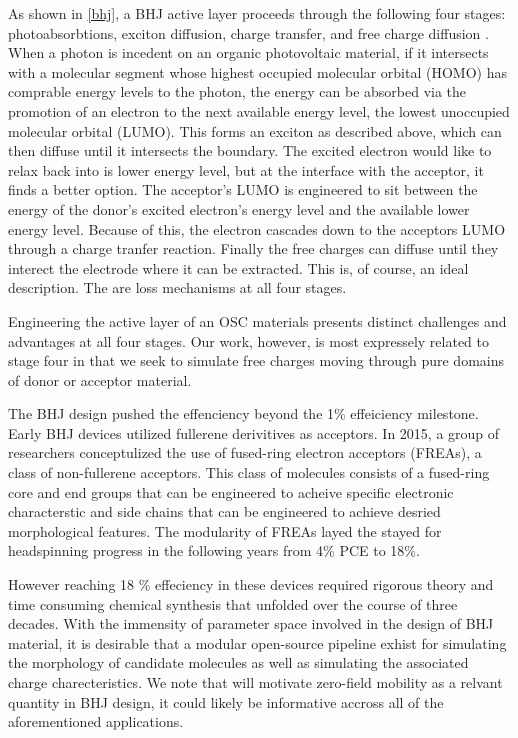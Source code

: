 As shown in \ref{bhj}, a BHJ active layer proceeds through the following four stages: photoabsorbtions, 
exciton diffusion, charge transfer, and free charge diffusion \citet{Fusella2019}. When a photon is incedent on
an organic photovoltaic material, if it intersects with a molecular segment whose 
highest occupied molecular orbital (HOMO) has comprable energy levels to the photon, the energy can be absorbed via the promotion of
an electron to the next available energy level, the lowest unoccupied molecular orbital (LUMO).
This forms an exciton as
described above, which can then diffuse until it intersects the boundary. 
The excited electron would like to relax
back into is lower energy level, but at the interface with the acceptor, it finds a better option. The
acceptor's LUMO is engineered to sit between the energy of the donor's excited electron's energy level and the
available lower energy level. Because of this, the electron cascades down to the acceptors LUMO through a charge
tranfer reaction. Finally the free charges can diffuse until they interect the electrode where it can be
extracted. This is, of course, an ideal description. The are loss mechanisms at all four stages. 

Engineering the active layer of an OSC materials presents distinct challenges and advantages at
all four stages. Our work, however,  is most expressely related to stage four in that we seek to simulate free charges moving
through pure domains of donor or acceptor material. 

The BHJ design pushed the effenciency beyond the 1\% effeiciency milestone. Early BHJ devices utilized
fullerene derivitives as acceptors. In 2015, a group of researchers conceptulized the use of
fused-ring electron acceptors (FREAs), a class of non-fullerene acceptors. This class of molecules consists of
a fused-ring core and end groups that can be engineered to acheive specific electronic characterstic and side
chains that can be engineered to achieve desried morphological features. The modularity of FREAs
layed the stayed for headspinning progress in the following years from 4\% PCE to 18\%.
\cite{Wang2021a}

However reaching 18 \% effeciency in these devices required rigorous theory and 
time consuming chemical synthesis
that unfolded over the course of three decades.  
With the immensity of parameter space involved in the design of BHJ material, it is desirable that a modular
open-source pipeline exhist for simulating the morphology of candidate molecules as well as simulating the 
associated charge charecteristics. 
We note that will motivate zero-field mobility as a relvant quantity in BHJ
design, it could likely be informative accross all of the aforementioned applications. 


